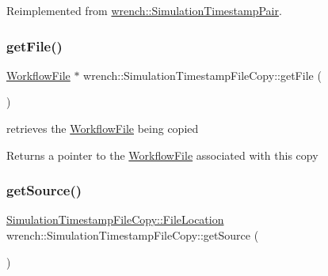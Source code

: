 Reimplemented from \hyperlink{classwrench_1_1_simulation_timestamp_pair_aa47d05297b863c29179a505ea4e5dfdf}{wrench\+::\+Simulation\+Timestamp\+Pair}.

\mbox{\label{classwrench_1_1_simulation_timestamp_file_copy_a20275ad1b9f85099fed946e656420e1c}} 
\subsubsection{\texorpdfstring{get\+File()}{getFile()}}
{\footnotesize\ttfamily \hyperlink{classwrench_1_1_workflow_file}{Workflow\+File} $\ast$ wrench\+::\+Simulation\+Timestamp\+File\+Copy\+::get\+File (\begin{DoxyParamCaption}{ }\end{DoxyParamCaption})}



retrieves the \hyperlink{classwrench_1_1_workflow_file}{Workflow\+File} being copied 

\begin{DoxyReturn}{Returns}
a pointer to the \hyperlink{classwrench_1_1_workflow_file}{Workflow\+File} associated with this copy 
\end{DoxyReturn}
\mbox{\label{classwrench_1_1_simulation_timestamp_file_copy_abde1808a7023d864ad0419cb9451d789}} 
\subsubsection{\texorpdfstring{get\+Source()}{getSource()}}
{\footnotesize\ttfamily \hyperlink{structwrench_1_1_simulation_timestamp_file_copy_1_1_file_location}{Simulation\+Timestamp\+File\+Copy\+::\+File\+Location} wrench\+::\+Simulation\+Timestamp\+File\+Copy\+::get\+Source (\begin{DoxyParamCaption}{ }\end{DoxyParamCaption})}



